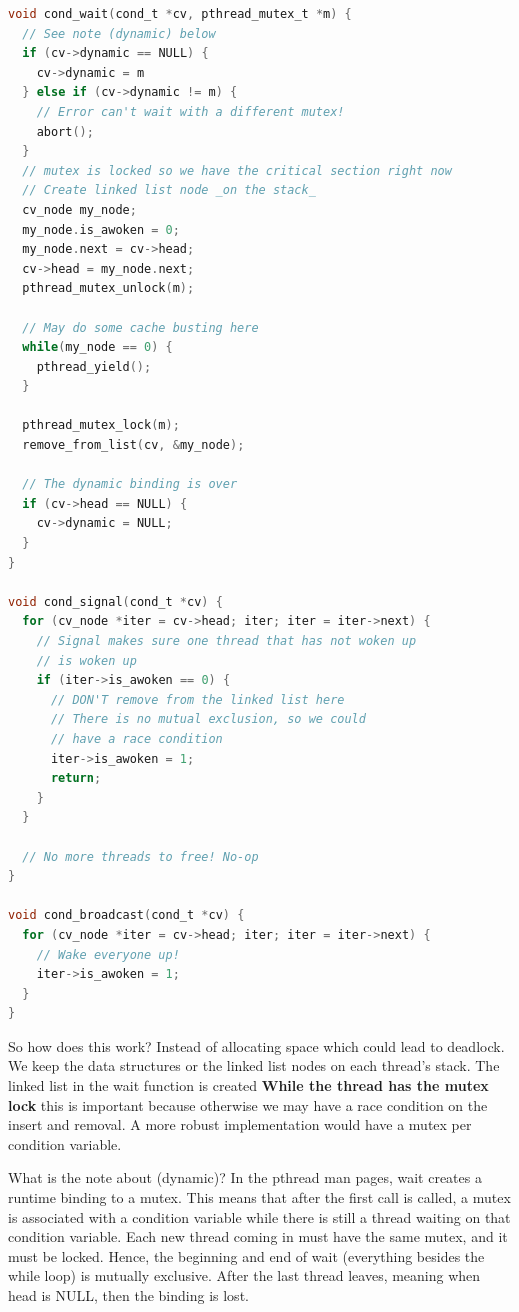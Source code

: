 \begin{lstlisting}[language=C]
void cond_wait(cond_t *cv, pthread_mutex_t *m) {
  // See note (dynamic) below
  if (cv->dynamic == NULL) {
    cv->dynamic = m
  } else if (cv->dynamic != m) {
    // Error can't wait with a different mutex!
    abort();
  }
  // mutex is locked so we have the critical section right now
  // Create linked list node _on the stack_
  cv_node my_node;
  my_node.is_awoken = 0;
  my_node.next = cv->head;
  cv->head = my_node.next;
  pthread_mutex_unlock(m);

  // May do some cache busting here
  while(my_node == 0) {
    pthread_yield();
  }

  pthread_mutex_lock(m);
  remove_from_list(cv, &my_node);

  // The dynamic binding is over
  if (cv->head == NULL) {
    cv->dynamic = NULL;
  }
}

void cond_signal(cond_t *cv) {
  for (cv_node *iter = cv->head; iter; iter = iter->next) {
    // Signal makes sure one thread that has not woken up
    // is woken up
    if (iter->is_awoken == 0) {
      // DON'T remove from the linked list here
      // There is no mutual exclusion, so we could
      // have a race condition
      iter->is_awoken = 1;
      return;
    }
  }

  // No more threads to free! No-op
}

void cond_broadcast(cond_t *cv) {
  for (cv_node *iter = cv->head; iter; iter = iter->next) {
    // Wake everyone up!
    iter->is_awoken = 1;
  }
}
\end{lstlisting}

So how does this work?
Instead of allocating space which could lead to deadlock.
We keep the data structures or the linked list nodes on each thread's stack.
The linked list in the wait function is created \textbf{While the thread has the mutex lock} this is important because otherwise we may have a race condition on the insert and removal.
A more robust implementation would have a mutex per condition variable.

What is the note about (dynamic)?
In the pthread man pages, wait creates a runtime binding to a mutex. This means that after the first call is called, a mutex is associated with a condition variable while there is still a thread waiting on that condition variable.
Each new thread coming in must have the same mutex, and it must be locked.
Hence, the beginning and end of wait (everything besides the while loop) is mutually exclusive.
After the last thread leaves, meaning when head is NULL, then the binding is lost.

